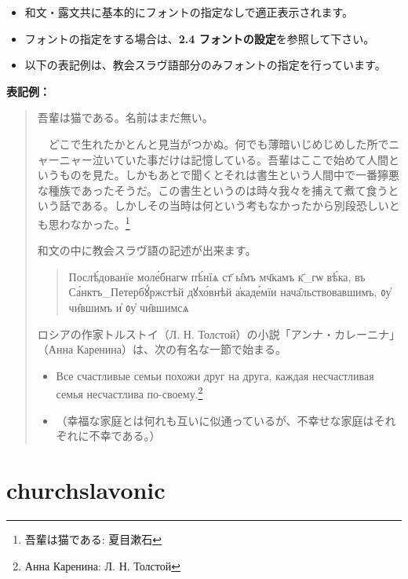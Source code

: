 \documentclass[a4paper,12pt]{ltjsarticle}
\begin{document}
\begin{itemize}
  \item 和文・露文共に基本的にフォントの指定なしで適正表示されます。
  \item フォントの指定をする場合は、\textbf{2.4 フォントの設定}を参照して下さい。
  \item 以下の表記例は、教会スラヴ語部分のみフォントの指定を行っています。
  \end{itemize}
\vspace{-2mm}
\hspace{12mm}\textbf{表記例：}
\vspace{-2mm}
\begin{quote}
吾輩は猫である。名前はまだ無い。\par
　どこで生れたかとんと見当がつかぬ。何でも薄暗いじめじめした所でニャーニャー泣いていた事だけは記憶している。吾輩はここで始めて人間というものを見た。しかもあとで聞くとそれは書生という人間中で一番獰悪な種族であったそうだ。この書生というのは時々我々を捕えて煮て食うという話である。しかしその当時は何という考もなかったから別段恐しいとも思わなかった。\footnote{吾輩は猫である: 夏目漱石}\par
和文の中に教会スラヴ語の記述が出来ます。
\begin{quote}
{\Monomakh Послѣ́дованїе моле́бнагѡ пѣ́нїѧ ст҃ ы̑мъ мч҃камъ к҃_гѡ вѣ́ка, въ Са́нктъ_Петербꙋ́ржстѣй дꙋхо́внѣй а҆каде́мїи нача̑льствовавшимъ, ᲂу҆ чи̑вшимъ и҆ ᲂу҆ чи̑вшимсѧ}\par
\end{quote}
ロシアの作家トルストイ（Л. Н. Толстой）の小説「アンナ・カレーニナ」（Анна Каренина）は、次の有名な一節で始まる。
\begin{itemize}
\item[] Все счастливые семьи похожи друг на друга, каждая несчастливая семья несчастлива по-своему.\footnote{Анна Каренина: Л. Н. Толстой}
\item[]（幸福な家庭とは何れも互いに似通っているが、不幸せな家庭はそれぞれに不幸である。）
\end{itemize}
\end{quote}
\vspace{-10mm}

\section{\textbf{churchslavonic}}
\end{document}
